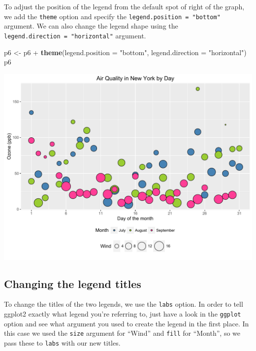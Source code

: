 \documentclass[]{article}
\newenvironment{Shaded}{\begin{snugshade}}{\end{snugshade}}
\newcommand{\KeywordTok}[1]{\textcolor[rgb]{0.13,0.29,0.53}{\textbf{{#1}}}}
\newcommand{\DataTypeTok}[1]{\textcolor[rgb]{0.13,0.29,0.53}{{#1}}}
\newcommand{\StringTok}[1]{\textcolor[rgb]{0.31,0.60,0.02}{{#1}}}
\newcommand{\NormalTok}[1]{{#1}}
\begin{document}
To adjust the position of the legend from the default spot of right of
the graph, we add the \texttt{theme} option and specify the
\texttt{legend.position\ =\ "bottom"} argument. We can also change the
legend shape using the \texttt{legend.direction\ =\ "horizontal"}
argument.

\begin{Shaded}
\begin{Highlighting}[]
\NormalTok{p6 <-}\StringTok{ }\NormalTok{p6 +}\StringTok{ }\KeywordTok{theme}\NormalTok{(}\DataTypeTok{legend.position =} \StringTok{"bottom"}\NormalTok{, }\DataTypeTok{legend.direction =} \StringTok{"horizontal"}\NormalTok{)}
\NormalTok{p6}
\end{Highlighting}
\end{Shaded}

\begin{center}\includegraphics{0_all_posts_pdf/wscatter_14-1} \end{center}

\subsection{Changing the legend
titles}\label{changing-the-legend-titles}

To change the titles of the two legends, we use the \texttt{labs}
option. In order to tell ggplot2 exactly what legend you're referring
to, just have a look in the \texttt{ggplot} option and see what argument
you used to create the legend in the first place. In this case we used
the \texttt{size} argument for ``Wind'' and \texttt{fill} for ``Month'',
so we pass these to \texttt{labs} with our new titles.
\end{document}
